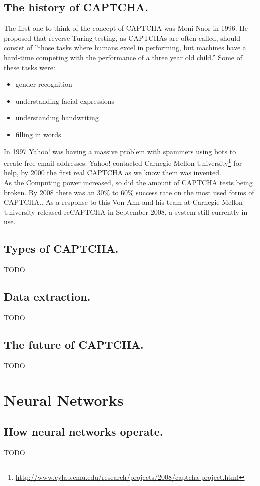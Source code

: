 \documentclass[pdftex,a4paper,12pt,twoside]{report}
\begin{document}
\subsection{The history of CAPTCHA.}
The first one to think of the concept of CAPTCHA was Moni Naor in 1996. He proposed that reverse Turing testing, as CAPTCHAs are often called, should consist of ''those tasks 
where humans excel in performing, but machines have a hard-time competing with the 
performance of a three year old child.'' Some of these tasks were:
\begin{itemize}
\item gender recognition
\item understanding facial expressions
\item understanding handwriting
\item filling in words
\end{itemize} \citep{Naor1996}
In 1997 Yahoo! was having a massive problem with spammers using bots to create free email addresses. Yahoo! contacted Carnegie Mellon University\footnote{\url{http://www.cylab.cmu.edu/research/projects/2008/captcha-project.html}} for help, by 2000 the first real CAPTCHA as we know them was invented\citep{Egen2009}.\\
As the Computing power increased, so did the amount of CAPTCHA tests being broken. By 2008 there was an 30\% to 60\% success rate on the most used forms of CAPTCHA.\citep{Yan2008}. As a  response to this Von Ahn and his team at Carnegie Mellon University released reCAPTCHA in September 2008, a system still currently in use.
\subsection{Types of CAPTCHA.}
TODO
\subsection{Data extraction.}
TODO
\subsection{The future of CAPTCHA.}
TODO
\section{Neural Networks}
\label{sec:neuralnetworks}
\subsection{How neural networks operate.}
TODO
\end{document}
